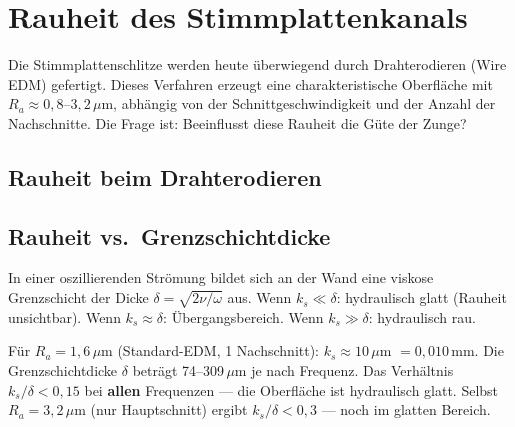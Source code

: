 \documentclass[11pt,a4paper]{article}
\begin{document}
\section{Rauheit des Stimmplattenkanals}

Die Stimmplattenschlitze werden heute überwiegend durch Drahterodieren (Wire EDM) gefertigt. Dieses Verfahren erzeugt eine charakteristische Oberfläche mit $R_a \approx 0{,}8$--$3{,}2\,\mu$m, abhängig von der Schnittgeschwindigkeit und der Anzahl der Nachschnitte. Die Frage ist: Beeinflusst diese Rauheit die Güte der Zunge?

\subsection{Rauheit beim Drahterodieren}

\begin{table}[H]
\centering\small
{}
\end{table}

\subsection{Rauheit vs.\ Grenzschichtdicke}

In einer oszillierenden Strömung bildet sich an der Wand eine viskose Grenzschicht der Dicke $\delta = \sqrt{2\nu/\omega}$ aus. Wenn $k_s \ll \delta$: hydraulisch glatt (Rauheit unsichtbar). Wenn $k_s \approx \delta$: Übergangsbereich. Wenn $k_s \gg \delta$: hydraulisch rau.

Für $R_a = 1{,}6\,\mu$m (Standard-EDM, 1 Nachschnitt): $k_s \approx 10\,\mu$m $= 0{,}010$\,mm. Die Grenzschichtdicke $\delta$ beträgt 74--309\,$\mu$m je nach Frequenz. Das Verhältnis $k_s/\delta < 0{,}15$ bei \textbf{allen} Frequenzen --- die Oberfläche ist hydraulisch glatt. Selbst $R_a = 3{,}2\,\mu$m (nur Hauptschnitt) ergibt $k_s/\delta < 0{,}3$ --- noch im glatten Bereich.
\end{document}
